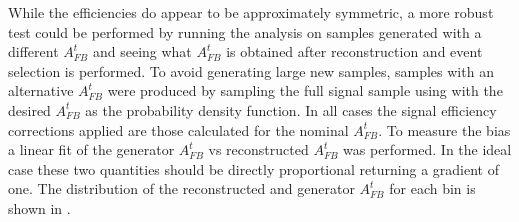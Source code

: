 While the efficiencies do appear to be approximately symmetric, a more robust test could be performed by running the analysis on samples generated with a different $A_{FB}^t$ and seeing what $A_{FB}^t$ is obtained after reconstruction and event selection is performed. To avoid generating large new samples, samples with an alternative $A_{FB}^t$ were produced by sampling the full signal sample using  with the desired $A_{FB}^t$ as the probability density function. In all cases the signal efficiency corrections applied are those calculated for the nominal $A_{FB}^t$. To measure the bias a linear fit of the generator $A_{FB}^t$ vs reconstructed $A_{FB}^t$ was performed. In the ideal case these two quantities should be directly proportional returning a gradient of one. The distribution of the reconstructed and generator $A_{FB}^t$ for each bin is shown in .


